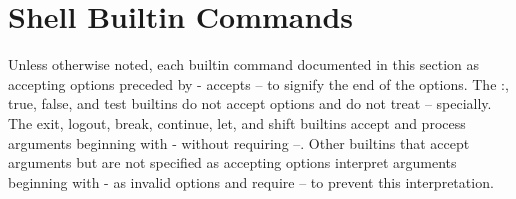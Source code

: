 \section{Shell Builtin Commands}\label{sec:shellbuiltincommands}

Unless otherwise noted, each builtin command documented in this section as accepting options preceded by - accepts -- to signify the end of the options. The :, true, false, and test builtins do not accept options and do not treat -- specially. The exit, logout, break, continue, let, and shift builtins accept and process arguments beginning with - without requiring --. Other builtins that accept arguments but are not specified as accepting options interpret arguments beginning with - as invalid options and require -- to prevent this interpretation.

\begin{longtable}



\end{longtable}
